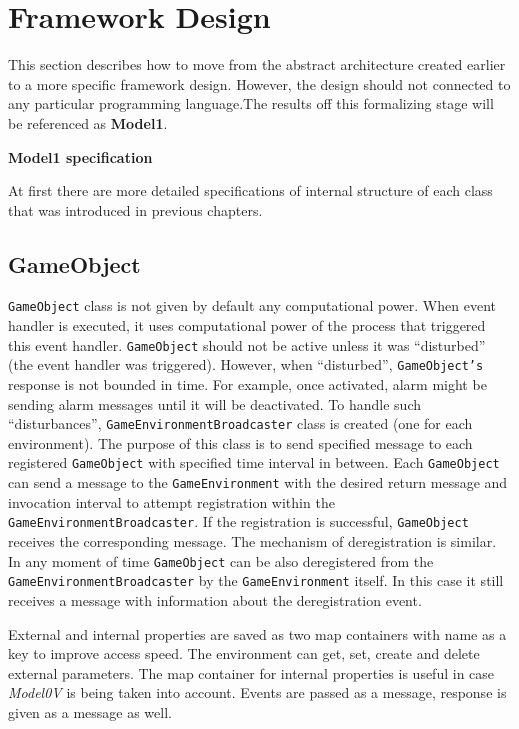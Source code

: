 \section{Framework Design}
This section describes how to move from the abstract architecture created earlier to a more specific framework design. However, the design should not connected to any particular programming language.The results off this formalizing stage will be referenced as \textbf{Model1}.
\begin{center}
    \textbf{Model1 specification}
\end{center}
At first there are more detailed specifications of internal structure of each class that was introduced in previous chapters.
\subsection{GameObject}
\texttt{GameObject} class is not given by default  any computational power. When event handler is executed, it uses computational power of the process that triggered this event handler. \texttt{GameObject} should not be active unless it was ``disturbed'' (the event handler was triggered). However, when ``disturbed'', \texttt{GameObject's} response is not bounded in time. For example, once activated, alarm might be sending alarm messages until it will be deactivated. To handle such ``disturbances'', \texttt{GameEnvironmentBroadcaster} class is created (one for each environment). The purpose of this class is to send specified message to each registered \texttt{GameObject} with specified time interval in between. Each \texttt{GameObject}  can send a message to the \texttt{GameEnvironment} with the desired return message and invocation interval to attempt registration within the \texttt{GameEnvironmentBroadcaster}. If the registration is successful, \texttt{GameObject} receives the corresponding message. The mechanism of deregistration is similar. In any moment of time \texttt{GameObject} can be also deregistered from the \texttt{GameEnvironmentBroadcaster} by the \texttt{GameEnvironment} itself. In this case it still receives a message with information about the deregistration event.\par
External and internal properties are saved as two map containers with name as a key to improve access speed. The environment can get, set, create and delete external parameters.
The map container for internal properties is useful in case \textit{Model0V} is being taken into account.
Events are passed as a message, response is given as a message as well.

